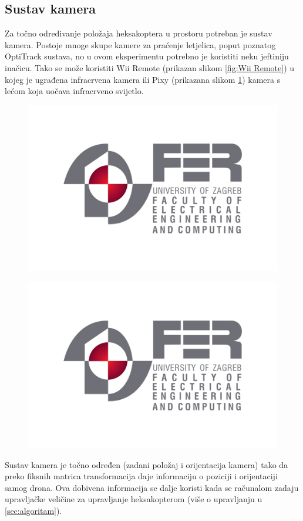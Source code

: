 \documentclass[times, utf8, diplomski]{fer}
\begin{document}
\subsection{Sustav kamera}\label{sec:kamera}
Za točno određivanje položaja heksakoptera u prostoru potreban je sustav kamera. Postoje mnoge skupe kamere za praćenje letjelica, poput poznatog OptiTrack sustava, no u ovom eksperimentu potrebno je koristiti neku jeftiniju inačicu. Tako se može koristiti Wii Remote (prikazan slikom \ref{fig:Wii Remote}) u kojeg je ugrađena infracrvena kamera ili Pixy (prikazana slikom \ref{fig:Pixy kamera}) kamera s lećom koja uočava infracrveno svijetlo. 
\begin{figure}[htb]
\centering
\begin{minipage}{.5\textwidth}
  \centering
  \includegraphics[width=.4\linewidth]{img/fer_logo.jpg}
  \label{fig:Wii Remote}
\end{minipage}%
\begin{minipage}{.5\textwidth}
  \centering
  \includegraphics[width=.4\linewidth]{img/fer_logo.jpg}
  \label{fig:Pixy kamera}
\end{minipage}
\end{figure}
Sustav kamera je točno određen (zadani položaj i orijentacija kamera) tako da preko fiksnih matrica transformacija daje informaciju o poziciji i orijentaciji samog drona. Ova dobivena informacija se dalje koristi kada se računalom zadaju upravljačke veličine za upravljanje heksakopterom (više o upravljanju u \ref{sec:algoritam}).
\end{document}
